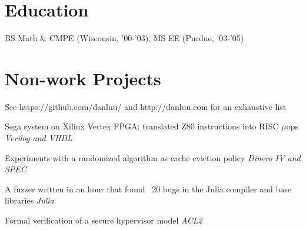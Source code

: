 \documentclass[letterpaper]{scrartcl}
\begin{document}
\section*{Education}
\begin{list1}
\item
  \begin{tabular1bold}BS Math \& CMPE (Wisconsin, '00-'03), MS EE (Purdue, '03-'05)\end{tabular1bold}
\end{list1}

\section*{Non-work Projects}
\begin{list1}
\item
  \begin{list2}
  \item See https://github.com/danluu/ and http://danluu.com for an exhaustive list
    \begin{list3}
    \item Sega system on Xilinx Vertex FPGA; translated Z80 instructions into RISC $\mu$ops \hfill \emph{Verilog and VHDL}
    \item Experiments with a randomized algorithm as cache eviction policy \hfill \emph{Dinero IV and SPEC}
    \item A fuzzer written in an hour that found ~20 bugs in the Julia compiler and base libraries \hfill \emph{Julia}
    \item Formal verification of a secure hypervisor model \hfill \emph{ACL2}
    \end{list3}


  \end{list2}
\end{list1}
\end{document}
